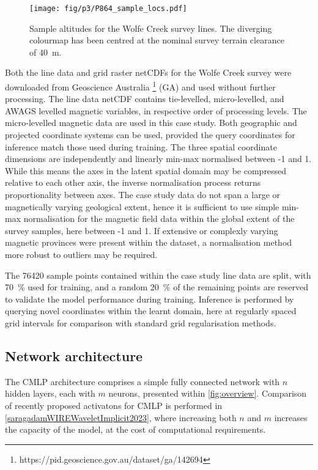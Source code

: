 \documentclass[manuscript.tex]{subfiles}
\begin{document}
\begin{figure}[hbt]
    \centering{}
    \texttt{[image: fig/p3/P864\_sample\_locs.pdf]}
    \caption[Point samples]{Sample altitudes for the Wolfe Creek survey lines. The diverging colourmap has been centred at the nominal survey terrain clearance of \SI{40}{\m}.}
    \label{fig:samples}
\end{figure}

Both the line data and grid raster netCDFs for the Wolfe Creek survey were downloaded from Geoscience Australia \footnote{https://pid.geoscience.gov.au/dataset/ga/142694} (GA) and used without further processing.
The line data netCDF contains tie-levelled, micro-levelled, and AWAGS levelled magnetic variables, in respective order of processing levels.
The micro-levelled magnetic data are used in this case study. %
Both geographic and projected coordinate systems can be used, provided the query coordinates for inference match those used during training.
The three spatial coordinate dimensions are independently and linearly min-max normalised between -1 and 1.
While this means the axes in the latent spatial domain may be compressed relative to each other axis, the inverse normalisation process returns proportionality between axes.
The case study data do not span a large or magnetically varying geological extent, hence it is sufficient to use simple min-max normalisation for the magnetic field data within the global extent of the survey samples, here between -1 and 1.
If extensive or complexly varying magnetic provinces were present within the dataset, a normalisation method more robust to outliers may be required.

The \SI{76420}{} sample points contained within the case study line data are split, with \qty{70}{\percent} used for training, and a random \qty{20}{\percent} of the remaining points are reserved to validate the model performance during training.
Inference is performed by querying novel coordinates within the learnt domain, here at regularly spaced grid intervals for comparison with standard grid regularisation methods.

\subsection{Network architecture}
The CMLP architecture comprises a simple fully connected network with \(n\) hidden layers, each with \(m\) neurons, presented within \cref{fig:overview}.
Comparison of recently proposed activatons for CMLP is performed in \cref{saragadamWIREWaveletImplicit2023}, where increasing both \(n\) and \(m\) increases the capacity of the model, at the cost of computational requirements.
\end{document}
